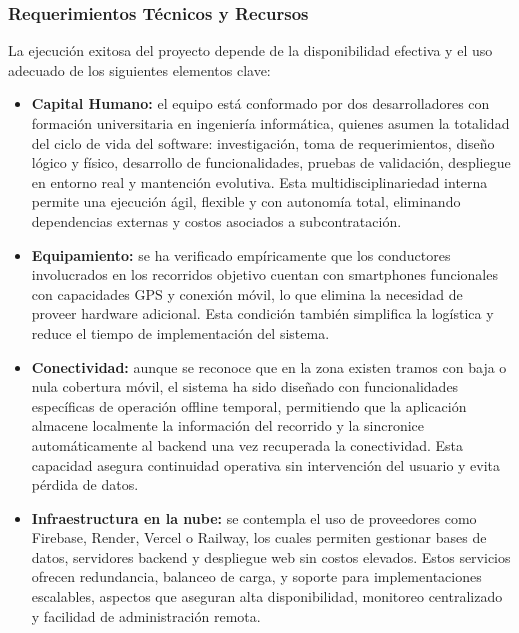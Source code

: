 \documentclass[12pt]{article}
\begin{document}
\subsubsection{Requerimientos Técnicos y Recursos}
La ejecución exitosa del proyecto depende de la disponibilidad efectiva y el uso adecuado de los siguientes elementos clave: 
\begin{itemize}
    \item \textbf{Capital Humano: }el equipo está conformado por dos desarrolladores con formación universitaria en ingeniería informática, quienes asumen la totalidad del ciclo de vida del software: investigación, toma de requerimientos, diseño lógico y físico, desarrollo de funcionalidades, pruebas de validación, despliegue en entorno real y mantención evolutiva. Esta multidisciplinariedad interna permite una ejecución ágil, flexible y con autonomía total, eliminando dependencias externas y costos asociados a subcontratación. 
    \item \textbf{Equipamiento: }se ha verificado empíricamente que los conductores involucrados en los recorridos objetivo cuentan con smartphones funcionales con capacidades GPS y conexión móvil, lo que elimina la necesidad de proveer hardware adicional. Esta condición también simplifica la logística y reduce el tiempo de implementación del sistema. 
    \item \textbf{Conectividad: }aunque se reconoce que en la zona existen tramos con baja o nula cobertura móvil, el sistema ha sido diseñado con funcionalidades específicas de operación offline temporal, permitiendo que la aplicación almacene localmente la información del recorrido y la sincronice automáticamente al backend una vez recuperada la conectividad. Esta capacidad asegura continuidad operativa sin intervención del usuario y evita pérdida de datos.
    \item \textbf{Infraestructura en la nube:} se contempla el uso de proveedores como Firebase, Render, Vercel o Railway, los cuales permiten gestionar bases de datos, servidores backend y despliegue web sin costos elevados. Estos servicios ofrecen redundancia, balanceo de carga, y soporte para implementaciones escalables, aspectos que aseguran alta disponibilidad, monitoreo centralizado y facilidad de administración remota.
\end{itemize}
\newpage
\end{document}
